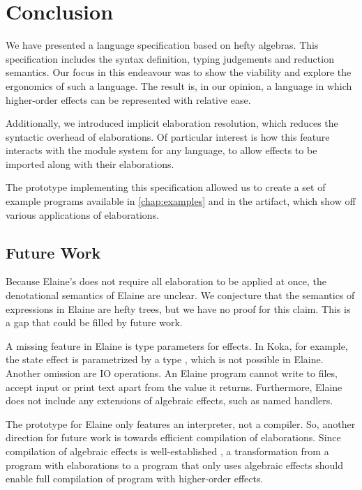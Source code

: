\chapter{Conclusion}\label{chap:conclusion}

We have presented a language specification based on hefty algebras. This specification includes the syntax definition, typing judgements and reduction semantics. Our focus in this endeavour was to show the viability and explore the ergonomics of such a language. The result is, in our opinion, a language in which higher-order effects can be represented with relative ease.

Additionally, we introduced implicit elaboration resolution, which reduces the syntactic overhead of elaborations. Of particular interest is how this feature interacts with the module system for any language, to allow effects to be imported along with their elaborations.

The prototype implementing this specification allowed us to create a set of example programs available in \cref{chap:examples} and in the artifact, which show off various applications of elaborations.

\section{Future Work}

Because Elaine's  does not require all elaboration to be applied at once, the denotational semantics of Elaine are unclear. We conjecture that the semantics of expressions in Elaine are hefty trees, but we have no proof for this claim. This is a gap that could be filled by future work.

A missing feature in Elaine is type parameters for effects. In Koka, for example, the state effect  is parametrized by a type , which is not possible in Elaine. Another omission are IO operations. An Elaine program cannot write to files, accept input or print text apart from the value it returns. Furthermore, Elaine does not include any extensions of algebraic effects, such as named handlers. 

The prototype for Elaine only features an interpreter, not a compiler. So, another direction for future work is towards efficient compilation of elaborations. Since compilation of algebraic effects is well-established \autocite{leijen_type_2017}, a transformation from a program with elaborations to a program that only uses algebraic effects should enable full compilation of program with higher-order effects.
